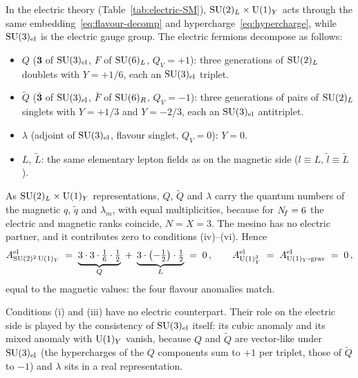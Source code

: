 \documentclass[11pt,a4paper]{article}
\begin{document}
In the electric theory (Table~\ref{tab:electric-SM}),
$\mathrm{SU}(2)_L \times \mathrm{U}(1)_Y$ acts through the same
embedding~\eqref{eq:flavour-decomp} and
hypercharge~\eqref{eq:hypercharge}, while $\mathrm{SU}(3)_{\mathrm{el}}$ is the
electric gauge group.  The electric fermions decompose as follows:
\begin{itemize}
  \item $Q$ ($\mathbf{3}$ of $\mathrm{SU}(3)_{\mathrm{el}}$, $F$ of $\mathrm{SU}(6)_L$,
    $Q_V = +1$): three generations of $\mathrm{SU}(2)_L$ doublets with
    $Y = +1/6$, each an $\mathrm{SU}(3)_{\mathrm{el}}$ triplet.
  \item $\widetilde{Q}$ ($\bar{\mathbf{3}}$ of $\mathrm{SU}(3)_{\mathrm{el}}$,
    $\bar{F}$ of $\mathrm{SU}(6)_R$, $Q_V = -1$): three generations of pairs of
    $\mathrm{SU}(2)_L$ singlets with $Y = +1/3$ and $Y = -2/3$, each an
    $\mathrm{SU}(3)_{\mathrm{el}}$ antitriplet.
  \item $\lambda$ (adjoint of $\mathrm{SU}(3)_{\mathrm{el}}$, flavour singlet,
    $Q_V = 0$): $Y = 0$.
  \item $L$, $\widetilde{L}$: the same elementary lepton fields as on the
    magnetic side ($l \equiv L$, $\widetilde{l} \equiv \widetilde{L}$).
\end{itemize}
As $\mathrm{SU}(2)_L \times \mathrm{U}(1)_Y$ representations, $Q$, $\widetilde{Q}$ and
$\lambda$ carry the quantum numbers of the magnetic $q$, $\widetilde{q}$
and $\lambda_m$, with equal multiplicities, because for $N_{\!f} = 6$ the
electric and magnetic ranks coincide, $N = X = 3$.  The mesino has no
electric partner, and it contributes zero to conditions (iv)--(vi).
Hence
\begin{equation}\label{eq:electric-anomalies}
  A^{\text{el}}_{\mathrm{SU}(2)^2\,\mathrm{U}(1)_Y}
  \;=\; \underbrace{3 \cdot 3 \cdot \tfrac{1}{6} \cdot \tfrac{1}{2}}_{Q}
  \;+\; \underbrace{3 \cdot \bigl(-\tfrac{1}{2}\bigr) \cdot \tfrac{1}{2}}_{L}
  \;=\; 0\,,
  \qquad
  A^{\text{el}}_{\mathrm{U}(1)_Y^3}
  \;=\; A^{\text{el}}_{\mathrm{U}(1)_Y\text{-grav}} \;=\; 0\,,
\end{equation}
equal to the magnetic values: the four flavour anomalies match.

Conditions (i) and (iii) have no electric counterpart.  Their role on
the electric side is played by the consistency of $\mathrm{SU}(3)_{\mathrm{el}}$
itself: its cubic anomaly and its mixed anomaly with $\mathrm{U}(1)_Y$ vanish,
because $Q$ and $\widetilde{Q}$ are vector-like under
$\mathrm{SU}(3)_{\mathrm{el}}$ (the hypercharges of the $Q$ components sum to
$+1$ per triplet, those of $\widetilde{Q}$ to $-1$) and $\lambda$ sits in
a real representation.
\end{document}
